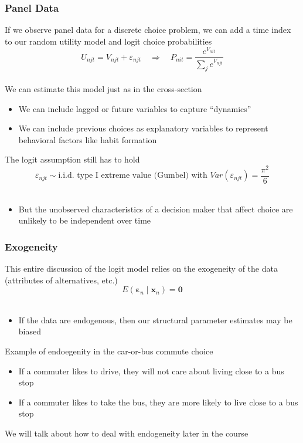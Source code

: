 \documentclass{beamer}
\begin{document}
\begin{frame}\frametitle{Panel Data}
    If we observe panel data for a discrete choice problem, we can add a time index to our random utility model and logit choice probabilities
    $$U_{njt} = V_{njt} + \varepsilon_{njt} \quad \Rightarrow \quad P_{nit} = \frac{e^{V_{nit}}}{\sum_j e^{V_{njt}}}$$ \\
    \vspace{2ex}
    We can estimate this model just as in the cross-section
    \begin{itemize}
        \item We can include lagged or future variables to capture ``dynamics''
        \item We can include previous choices as explanatory variables to represent behavioral factors like habit formation
    \end{itemize}
    \vspace{2ex}
    The logit assumption still has to hold
    $$\varepsilon_{njt} \sim \text{i.i.d.\ type I extreme value (Gumbel) with } Var(\varepsilon_{njt}) = \frac{\pi^2}{6}$$ \\
    \begin{itemize}
        \item But the unobserved characteristics of a decision maker that affect choice are unlikely to be independent over time
    \end{itemize}
\end{frame}

\begin{frame}\frametitle{Exogeneity}
    This entire discussion of the logit model relies on the exogeneity of the data (attributes of alternatives, etc.)
    $$E(\bm{\varepsilon}_n \mid \bm{x}_n) = \bm{0}$$ \\
    \begin{itemize}
        \item If the data are endogenous, then our structural parameter estimates may be biased
    \end{itemize}
    \vspace{2ex}
    Example of endoegenity in the car-or-bus commute choice
    \begin{itemize}
        \item If a commuter likes to drive, they will not care about living close to a bus stop
        \item If a commuter likes to take the bus, they are more likely to live close to a bus stop
    \end{itemize}
    \vspace{2ex}
    We will talk about how to deal with endogeneity later in the course
\end{frame}
\end{document}
